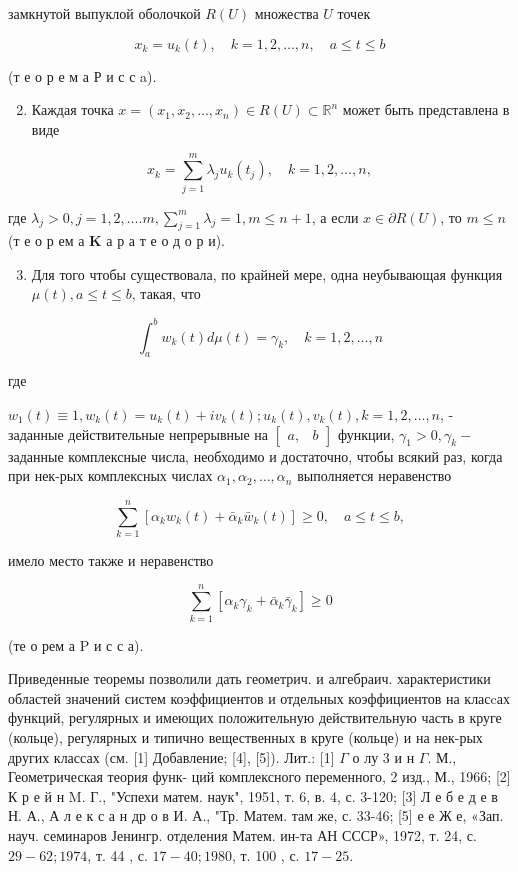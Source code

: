 \documentclass[10pt]{article}
\begin{document}
замкнутой выпуклой оболочкой $R(U)$ множества $U$ точек

\[
x_{k}=u_{k}(t), \quad k=1,2, \ldots, n, \quad a \leqslant t \leqslant b
\]

(т е о р е м а Р и с с a).

\begin{enumerate}
  \setcounter{enumi}{1}
  \item Каждая точка $x=\left(x_{1}, x_{2}, \ldots, x_{n}\right) \in R(U) \subset \mathbb{R}^{n}$ может быть представлена в виде
\end{enumerate}

\[
x_{k}=\sum_{j=1}^{m} \lambda_{j} u_{k}\left(t_{j}\right), \quad k=1,2, \ldots, n,
\]

где $\lambda_{j}>0, j=1,2, \ldots . m, \sum_{j=1}^{m} \lambda_{j}=1, m \leqslant n+1$, а если $x \in \partial R(U)$, то $m \leqslant n$ (т е о р ем а $\mathbf{K}$ а р а т е о д о р и).

\begin{enumerate}
  \setcounter{enumi}{2}
  \item Для того чтобы существовала, по крайней мере, одна неубывающая функция $\mu(t), a \leqslant t \leqslant b$, такая, что
\end{enumerate}

\[
\int_{a}^{b} w_{k}(t) d \mu(t)=\gamma_{k}, \quad k=1,2, \ldots, n
\]

где

$w_{1}(t) \equiv 1, w_{k}(t)=u_{k}(t)+i v_{k}(t) ; u_{k}(t), v_{k}(t), k=1,2, \ldots, n$, - заданные действительные непрерывные на $\left[\begin{array}{ll}a, & b\end{array}\right]$ функции, $\gamma_{1}>0, \gamma_{k}-$ заданные комплексные числа, необходимо и достаточно, чтобы всякий раз, когда при нек-рых комплексных числах $\alpha_{1}, \alpha_{2}, \ldots, \alpha_{n}$ выполняется неравенство

\[
\sum_{k=1}^{n}\left[\alpha_{k} w_{k}(t)+\bar{\alpha}_{k} \bar{w}_{k}(t)\right] \geqslant 0, \quad a \leqslant t \leqslant b,
\]

имело место также и неравенство

\[
\sum_{k=1}^{n}\left[\alpha_{k} \gamma_{k}+\bar{\alpha}_{k} \bar{\gamma}_{k}\right] \geqslant 0
\]

(те о рем а $\mathrm{P}$ и с с а).

Приведенные теоремы позволили дать геометрич. и алгебраич. характеристики областей значений систем коэффициентов и отдельных коэффициентов на класcах функций, регулярных и имеющих положительную действительную часть в круге (кольце), регулярных и типично вещественных в круге (кольце) и на нек-рых других классах (см. [1] Добавление; [4], [5]). Лит.: [1] $\Gamma$ о лу 3 и н $\Gamma$. М., Геометрическая теория функ-
ций комплексного переменного, 2 изд., М., 1966; [2] К р е й н M. Г., "Успехи матем. наук", 1951, т. 6, в. 4, с. 3-120; [3] Л е б е д е в Н. А., А л е к с а н др о в И. А., "Тр. Матем. там же, с. 33-46; [5] е е Ж е, «Зап. науч. семинаров Јенингр. отделения Матем. ин-та АН СССР», 1972, т. 24, с. $29-62 ; 1974$, т. 44 , с. $17-40 ; 1980$, т. 100 , с. $17-25$.
\end{document}
